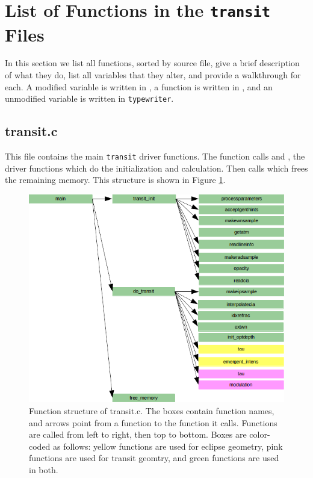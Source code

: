 \documentclass[letterpaper,12pt]{article}
\begin{document}
\section{List of Functions in the \texttt{transit} Files}
\label{sec:functions}
In this section we list all functions, sorted by source file, give a brief description of what they do, list all variables that they alter, and provide a walkthrough for each. A modified variable is written in , a function is written in , and an unmodified variable is written in {\tt typewriter}.
\subsection{transit.c}
This file contains the main {\tt transit} driver functions. The  function calls  and , the driver functions which do the initialization and calculation. Then  calls  which frees the remaining memory. This structure is shown in Figure \ref{fig:transitc}.

\begin{figure}
\includegraphics{fig/transitc}
\caption{Function structure of transit.c. The boxes contain function names, and arrows point from a function to the function it calls. Functions are called from left to right, then top to bottom. Boxes are color-coded as follows:  yellow functions are used for eclipse geometry, pink functions are used for transit geomtry, and green functions are used in both.}
\label{fig:transitc}
\end{figure}
\end{document}
